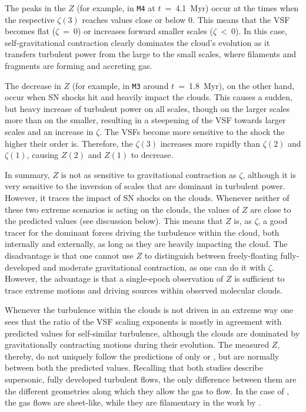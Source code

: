 The peaks in the $Z$ (for example, in \texttt{M4} at $t$~=~4.1~Myr) occur at the times when the respective $\zeta(3)$ reaches values close or below 0.
This means that the VSF becomes flat ($\zeta$~=~0) or increases forward smaller scales ($\zeta~<~0$). 
In this case, self-gravitational contraction clearly dominates the cloud's evolution as it transfers turbulent power from the large to the small scales, where filaments and fragments are forming and accreting gas.

The decrease in $Z$ (for example, in \texttt{M3} around $t$~=~1.8~Myr), on the other hand, occur when SN shocks hit and heavily impact the clouds. 
This causes a sudden, but heavy increase of turbulent power on all scales, though on the larger scales more than on the smaller, resulting in a steepening of the VSF towards larger scales and an increase in $\zeta$.
The VSFs become more sensitive to the shock the higher their order is.
Therefore, the $\zeta(3)$ increases more rapidly than $\zeta(2)$ and $\zeta(1)$, causing $Z(2)$ and $Z(1)$ to decrease.

In summary, $Z$ is not as sensitive to gravitational contraction as $\zeta$, although it is very sensitive to the inversion of scales that are dominant in turbulent power.
However, it traces the impact of SN shocks on the clouds.
Whenever neither of these two extreme scenarios is acting on the clouds, the values of $Z$ are close to the predicted values (see discussion below).
This means that $Z$ is, as $\zeta$, a good tracer for the dominant forces driving the turbulence within the cloud, both internally and externally, as long as they are heavily impacting the cloud.
The disadvantage is that one cannot use $Z$ to distinguish between freely-floating fully-developed and moderate gravitational contraction, as one can do it with $\zeta$.
However, the advantage is that a single-epoch observation of $Z$ is sufficient to trace extreme motions and driving sources within observed molecular clouds.

Whenever the turbulence within the clouds is not driven in an extreme way one sees that the ratio of the VSF scaling exponents is mostly in agreement with predicted values for self-similar turbulence, although the clouds are dominated by gravitationally contracting motions during their evolution.
The measured $Z$, thereby, do not uniquely follow the predictions of only \citet{Boldyrev2002} or \citet{She1994}, but are normally between both the predicted values.
Recalling that both studies describe supersonic, fully developed turbulent flows, the only difference between them are the different geometries along which they allow the gas to flow.
In the case of \citet{Boldyrev2002}, the gas flows are sheet-like, while they are filamentary in the work by \citet{She1994}.

